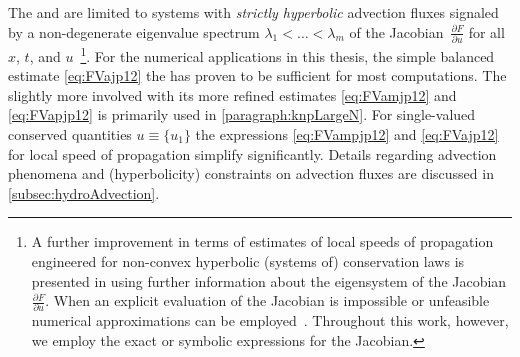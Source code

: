 \begin{enumerate}[label=\textbf{\arabic*}.]
	The \kt{} and \knpScheme{} are limited to systems with \textit{strictly hyperbolic} advection fluxes signaled by a non-degenerate eigenvalue spectrum $\lambda_1 < \ldots < \lambda_m$ of the Jacobian~$ \frac{\partial F}{\partial u} $ for all $x$, $t$, and $u$~\cite{KTO2-0,KTO2-1}\footnote{%
		A further improvement in terms of estimates of local speeds of propagation engineered for non-convex hyperbolic (systems of) conservation laws is presented in  using further information about the eigensystem of the Jacobian $\frac{\partial F}{\partial u}$. 
		When an explicit evaluation of the Jacobian is impossible or unfeasible numerical approximations can be employed~\cite{KTO2-0,LiuTadmore2000,Jiang97non-oscillatorycentral}.
		Throughout this work, however, we employ the exact or symbolic expressions for the Jacobian.%
	}.
	For the numerical applications in this thesis, the simple balanced estimate \eqref{eq:FVajp12} \dash{} the \ktScheme{} \dash{} has proven to be sufficient for most computations.
	The slightly more involved \knpScheme{} with its more refined estimates \eqref{eq:FVamjp12} and \eqref{eq:FVapjp12} is primarily used in \cref{paragraph:knpLargeN}.
	For single-valued conserved quantities $u \equiv \{ u_1\}$ the expressions \eqref{eq:FVampjp12} and \eqref{eq:FVajp12} for local speed of propagation simplify significantly.
	Details regarding advection phenomena and (hyperbolicity) constraints on advection fluxes are discussed in \cref{subsec:hydroAdvection}.


\end{enumerate}
